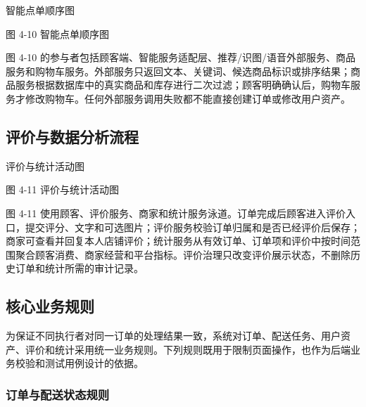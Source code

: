 智能点单顺序图

\begin{center}
\end{center}

图 4-10  智能点单顺序图

图 4-10 的参与者包括顾客端、智能服务适配层、推荐/识图/语音外部服务、商品服务和购物车服务。外部服务只返回文本、关键词、候选商品标识或排序结果；商品服务根据数据库中的真实商品和库存进行二次过滤；顾客明确确认后，购物车服务才修改购物车。任何外部服务调用失败都不能直接创建订单或修改用户资产。

\subsection{评价与数据分析流程}

评价与统计活动图

\begin{center}
\end{center}

图 4-11  评价与统计活动图

图 4-11 使用顾客、评价服务、商家和统计服务泳道。订单完成后顾客进入评价入口，提交评分、文字和可选图片；评价服务校验订单归属和是否已经评价后保存；商家可查看并回复本人店铺评价；统计服务从有效订单、订单项和评价中按时间范围聚合顾客消费、商家经营和平台指标。评价治理只改变评价展示状态，不删除历史订单和统计所需的审计记录。

\subsection{核心业务规则}

为保证不同执行者对同一订单的处理结果一致，系统对订单、配送任务、用户资产、评价和统计采用统一业务规则。下列规则既用于限制页面操作，也作为后端业务校验和测试用例设计的依据。

\subsubsection{订单与配送状态规则}

